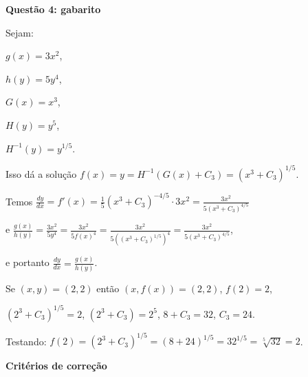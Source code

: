\documentclass[oneside,12pt]{article}
\begin{document}
%

\newpage


{\bf Questão 4: gabarito}

Sejam:

$g(x) = 3x^2$,

$h(y) = 5y^4$,

$G(x) = x^3$,

$H(y) = y^5$,

$H^{-1}(y) = y^{1/5}$.

Isso dá a solução $f(x) = y = H^{-1}(G(x)+C_3) = (x^3+C_3)^{1/5}$.

Temos $\frac{dy}{dx}
 = f'(x)
 = \frac{1}{5}(x^3+C_3)^{-4/5}·3x^2
 = \frac{3x^2}{5(x^3+C_3)^{4/5}}
 $

e $\frac{g(x)}{h(y)}
 = \frac{3x^2}{5y^4}
 = \frac{3x^2}{5f(x)^4}
 = \frac{3x^2}{5((x^3+C_3)^{1/5})^4}
 = \frac{3x^2}{5(x^3+C_3)^{4/5}}
$,

e portanto $\frac{dy}{dx} = \frac{g(x)}{h(y)}$.

Se $(x,y) = (2,2)$ então $(x,f(x))=(2,2)$, $f(2)=2$,

$(2^3+C_3)^{1/5} = 2$,
$(2^3+C_3) = 2^5$, 
$8+C_3 = 32$, 
$C_3 = 24$. 

Testando: $f(2) = (2^3+C_3)^{1/5} = (8+24)^{1/5} = 32^{1/5} = \sqrt[5]{32} = 2$.



\newpage

{\bf Critérios de correção}
\end{document}
